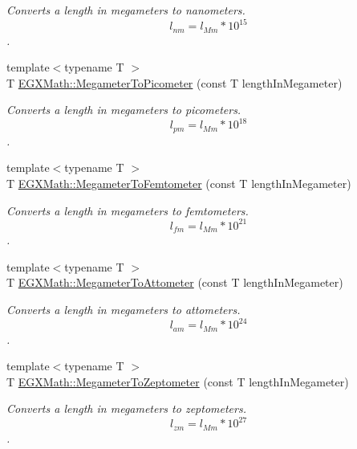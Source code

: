 \begin{DoxyCompactItemize}
\begin{DoxyCompactList}\small\item\em Converts a length in megameters to nanometers. \[ l_{nm}=l_{Mm} * 10^{15} \]. \end{DoxyCompactList}\item 
{\footnotesize template$<$typename T $>$ }\\T \mbox{\hyperlink{group___e_g_x_math-_conversions-_length_conversions-_s_i-_megameter-_s_i_ga0f6585bdcd16b6748b6c4d9116dd955c}{E\+G\+X\+Math\+::\+Megameter\+To\+Picometer}} (const T length\+In\+Megameter)
\begin{DoxyCompactList}\small\item\em Converts a length in megameters to picometers. \[ l_{pm}=l_{Mm} * 10^{18} \]. \end{DoxyCompactList}\item 
{\footnotesize template$<$typename T $>$ }\\T \mbox{\hyperlink{group___e_g_x_math-_conversions-_length_conversions-_s_i-_megameter-_s_i_gad53a3da18100c2bb2d12ecb9178ae597}{E\+G\+X\+Math\+::\+Megameter\+To\+Femtometer}} (const T length\+In\+Megameter)
\begin{DoxyCompactList}\small\item\em Converts a length in megameters to femtometers. \[ l_{fm}=l_{Mm} * 10^{21} \]. \end{DoxyCompactList}\item 
{\footnotesize template$<$typename T $>$ }\\T \mbox{\hyperlink{group___e_g_x_math-_conversions-_length_conversions-_s_i-_megameter-_s_i_ga13016f40e740def54199de991815f422}{E\+G\+X\+Math\+::\+Megameter\+To\+Attometer}} (const T length\+In\+Megameter)
\begin{DoxyCompactList}\small\item\em Converts a length in megameters to attometers. \[ l_{am}=l_{Mm} * 10^{24} \]. \end{DoxyCompactList}\item 
{\footnotesize template$<$typename T $>$ }\\T \mbox{\hyperlink{group___e_g_x_math-_conversions-_length_conversions-_s_i-_megameter-_s_i_ga38fee336ea865f1f7ec6541c2256a8fe}{E\+G\+X\+Math\+::\+Megameter\+To\+Zeptometer}} (const T length\+In\+Megameter)
\begin{DoxyCompactList}\small\item\em Converts a length in megameters to zeptometers. \[ l_{zm}=l_{Mm} * 10^{27} \]. \end{DoxyCompactList}\item 

\end{DoxyCompactItemize}

